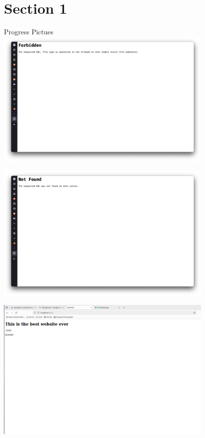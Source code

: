 \documentclass[aspectratio=169]{beamer}
\begin{document}
\section{Section 1}	%

\begin{frame}[c]{Progress Pictues}
  \centering
  \includegraphics[width=0.8\textwidth,height=\textheight,keepaspectratio]{00_errors.png}
\end{frame}

\begin{frame}[c]{}
  \centering
\includegraphics[width=0.8\textwidth,height=\textheight,keepaspectratio]{00_errors1.png}
\end{frame}

\begin{frame}[c]{}
  \centering
\includegraphics[width=0.8\textwidth,height=\textheight,keepaspectratio]{01_bare_html.png}
\end{frame}
\end{document}
